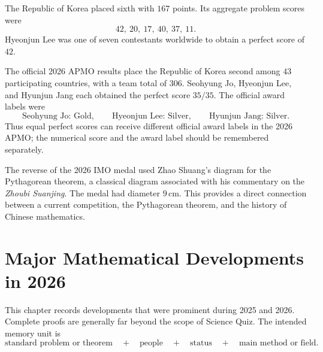     \begin{fact}
        The Republic of Korea placed sixth with $167$ points. Its aggregate problem scores were
        \[
            42,\ 20,\ 17,\ 40,\ 37,\ 11.
        \]
        Hyeonjun Lee was one of seven contestants worldwide to obtain a perfect
        score of $42$.
    \end{fact}

    \begin{fact}
        The official 2026 APMO results place the Republic of Korea second among
        $43$ participating countries, with a team total of $306$. Seohyung Jo,
        Hyeonjun Lee, and Hyunjun Jang each obtained the perfect score $35/35$.
        The official award labels were
        \[
            \text{Seohyung Jo: Gold},
            \qquad
            \text{Hyeonjun Lee: Silver},
            \qquad
            \text{Hyunjun Jang: Silver}.
        \]
        Thus equal perfect scores can receive different official award labels in
        the 2026 APMO; the numerical score and the award label should be remembered
        separately.
    \end{fact}

    \begin{fact}
        The reverse of the 2026 IMO medal used Zhao Shuang's diagram for the
        Pythagorean theorem, a classical diagram associated with his commentary
        on the \textit{Zhoubi Suanjing}. The medal had diameter $9\,\mathrm{cm}$.
        This provides a direct connection between a current competition, the
        Pythagorean theorem, and the history of Chinese mathematics.
    \end{fact}

    \chapter{Major Mathematical Developments in 2026}

    This chapter records developments that were prominent during 2025 and 2026.
    Complete proofs are generally far beyond the scope of Science Quiz. The
    intended memory unit is
    \[
        \text{standard problem or theorem}
        \quad+\quad
        \text{people}
        \quad+\quad
        \text{status}
        \quad+\quad
        \text{main method or field}.
    \]

    \vspace{1em}

